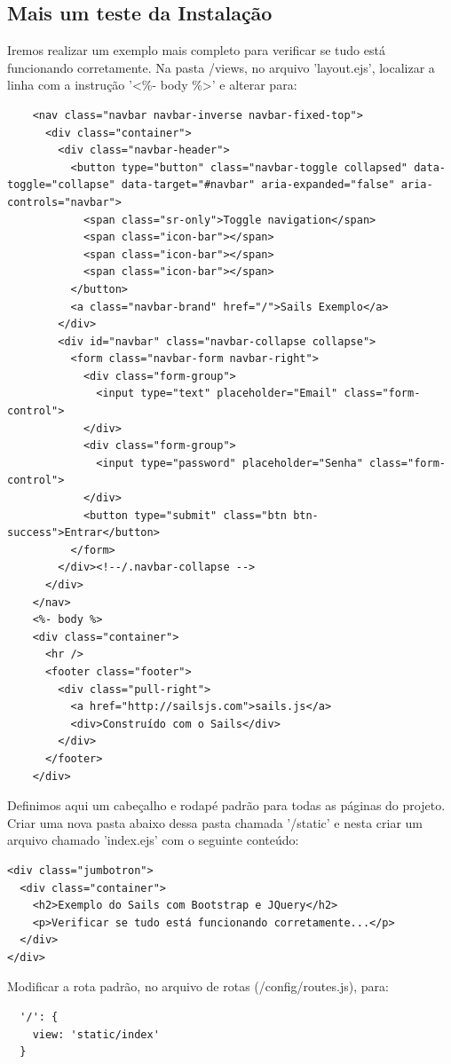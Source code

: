 \documentclass[a4paper,11pt]{article}
\begin{document}
\subsection{Mais um teste da Instalação}
Iremos realizar um exemplo mais completo para verificar se tudo está funcionando corretamente. Na pasta /views, no arquivo 'layout.ejs', localizar a linha com a instrução '\textless\%- body \%\textgreater' e alterar para:
\begin{lstlisting}
    <nav class="navbar navbar-inverse navbar-fixed-top">
      <div class="container">
        <div class="navbar-header">
          <button type="button" class="navbar-toggle collapsed" data-toggle="collapse" data-target="#navbar" aria-expanded="false" aria-controls="navbar">
            <span class="sr-only">Toggle navigation</span>
            <span class="icon-bar"></span>
            <span class="icon-bar"></span>
            <span class="icon-bar"></span>
          </button>
          <a class="navbar-brand" href="/">Sails Exemplo</a>
        </div>
        <div id="navbar" class="navbar-collapse collapse">
          <form class="navbar-form navbar-right">
            <div class="form-group">
              <input type="text" placeholder="Email" class="form-control">
            </div>
            <div class="form-group">
              <input type="password" placeholder="Senha" class="form-control">
            </div>
            <button type="submit" class="btn btn-success">Entrar</button>
          </form>
        </div><!--/.navbar-collapse -->
      </div>
    </nav>
    <%- body %>
    <div class="container">
      <hr />
      <footer class="footer">
        <div class="pull-right">
          <a href="http://sailsjs.com">sails.js</a>
          <div>Construído com o Sails</div>
        </div>
      </footer>
    </div>  
\end{lstlisting}
Definimos aqui um cabeçalho e rodapé padrão para todas as páginas do projeto. Criar uma nova pasta abaixo dessa pasta chamada '/static' e nesta criar um arquivo chamado 'index.ejs' com o seguinte conteúdo:
\begin{lstlisting}
<div class="jumbotron">
  <div class="container">
    <h2>Exemplo do Sails com Bootstrap e JQuery</h2>
    <p>Verificar se tudo está funcionando corretamente...</p>
  </div>
</div>
\end{lstlisting}
Modificar a rota padrão, no arquivo de rotas (/config/routes.js), para:
\begin{lstlisting}
  '/': {
    view: 'static/index'
  }
\end{lstlisting}
\end{document}
